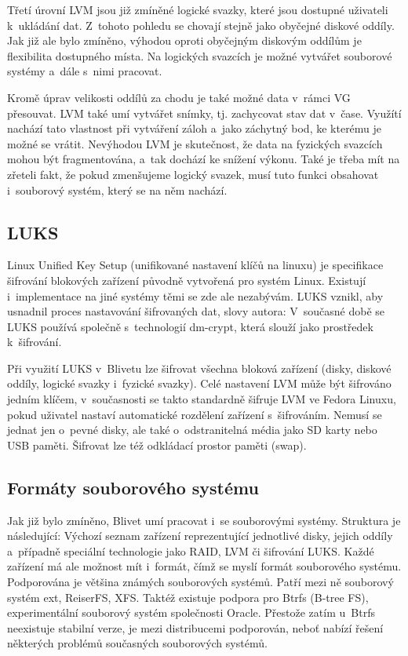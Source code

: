 \documentclass[color,table,oneside,nolot,nolof]{fithesis}
\begin{document}
	Třetí úrovní LVM jsou již zmíněné logické svazky, které jsou dostupné uživateli k~ukládání dat. Z~tohoto pohledu se chovají stejně jako obyčejné diskové oddíly. Jak již ale
	bylo zmíněno, výhodou oproti obyčejným diskovým oddílům je flexibilita dostupného místa. Na logických svazcích je možné vytvářet souborové systémy a~dále s~nimi pracovat.

	Kromě úprav velikosti oddílů za chodu je také možné data v~rámci VG přesouvat. LVM také umí vytvářet snímky, tj. zachycovat stav dat v~čase. Využítí nachází tato 
	vlastnost
	při vytváření záloh a~jako záchytný bod, ke kterému je možné se vrátit. Nevýhodou LVM je skutečnost, že data na fyzických svazcích mohou být fragmentována, a~tak
	dochází ke snížení výkonu. Také je třeba mít na zřeteli fakt, že pokud zmenšujeme logický svazek, musí tuto funkci obsahovat i~souborový systém, který se na něm nachází.

\subsection{LUKS}
	Linux Unified Key Setup (unifikované nastavení klíčů na linuxu) je specifikace šifrování blokových zařízení původně vytvořená pro systém Linux. Existují i~implementace na jiné 
	systémy
	těmi se zde ale nezabývám. LUKS vznikl, aby usnadnil proces nastavování šifrovaných dat, slovy autora: \cite{on-disk-format} V~současné době se LUKS používá společně s~technologií dm-crypt, která slouží jako prostředek k~šifrování.

	Při využití LUKS v~Blivetu lze šifrovat všechna bloková zařízení (disky, diskové oddíly, logické svazky i~fyzické svazky). Celé nastavení LVM může být šifrováno jedním klíčem, v~současnosti se takto 
	standardně šifruje LVM ve Fedora Linuxu, pokud uživatel nastaví automatické rozdělení zařízení s~šifrováním. Nemusí se jednat jen o~pevné disky, ale také o~odstranitelná média jako
	SD karty nebo USB paměti. Šifrovat lze též odkládací prostor paměti (swap).

\subsection{Formáty souborového systému}
  Jak již bylo zmíněno, Blivet umí pracovat i~se souborovými systémy. Struktura je následující: Výchozí seznam zařízení reprezentující jednotlivé disky, jejich oddíly a~případně
	speciální technologie jako RAID, LVM či šifrování LUKS. Každé zařízení má ale možnost mít i~formát, čímž se myslí formát souborového systému. Podporována je většina známých 
	souborových
	systémů. Patří mezi ně souborový systém ext, ReiserFS, XFS. Taktéž existuje podpora pro Btrfs (B-tree FS)\cite{btrfs}, experimentální souborový systém 
	společnosti Oracle. Přestože zatím u~Btrfs neexistuje stabilní verze, je mezi distribucemi podporován, neboť nabízí řešení některých problémů současných souborových systémů.
\end{document}
